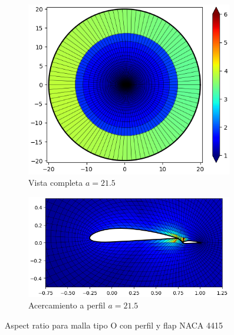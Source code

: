 \documentclass[letterpaper, openright, 12pt]{book}
\begin{document}
\begin{figure}[htbp!]
\begin{subfigure}[c]{0.48\textwidth}
            \includegraphics[keepaspectratio, width=0.99\textwidth]
                {./img/naca4415_flap_aa_215_aspect_far}
            \caption{Vista completa $a=21.5$}
            \label{fig:naca4415_flap_aa_215_aspect_far}
        \end{subfigure}
        \hfill
        \begin{subfigure}[c]{0.48\textwidth}
            \includegraphics[keepaspectratio, width=0.99\textwidth]
                {./img/naca4415_flap_aa_215_aspect_close}
            \caption{Acercamiento a perfil $a = 21.5$}
            \label{fig:naca4415_flap_aa_215_aspect_close}
        \end{subfigure}
        \caption{Aspect ratio para malla tipo O con perfil y flap NACA 4415}
        \label{fig:naca4415_flap_aspect_1}
    \end{figure}
\end{document}
